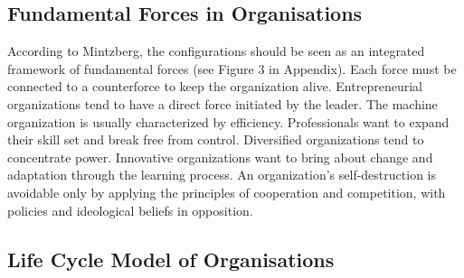 \documentclass[a4paper,12pt]{article}
\begin{document}
\subsection{Fundamental Forces in Organisations}

According to Mintzberg, the configurations should be seen as an integrated
framework of fundamental forces (see Figure 3 in Appendix). Each force must be
connected to a counterforce to keep the organization alive. Entrepreneurial
organizations tend to have a direct force initiated by the leader. The machine
organization is usually characterized by efficiency. Professionals want to
expand their skill set and break free from control. Diversified organizations
tend to concentrate power. Innovative organizations want to bring about change
and adaptation through the learning process. An organization's
self-destruction is avoidable only by applying the principles of cooperation
and competition, with policies and ideological beliefs in opposition.

\subsection{Life Cycle Model of Organisations}
\end{document}
